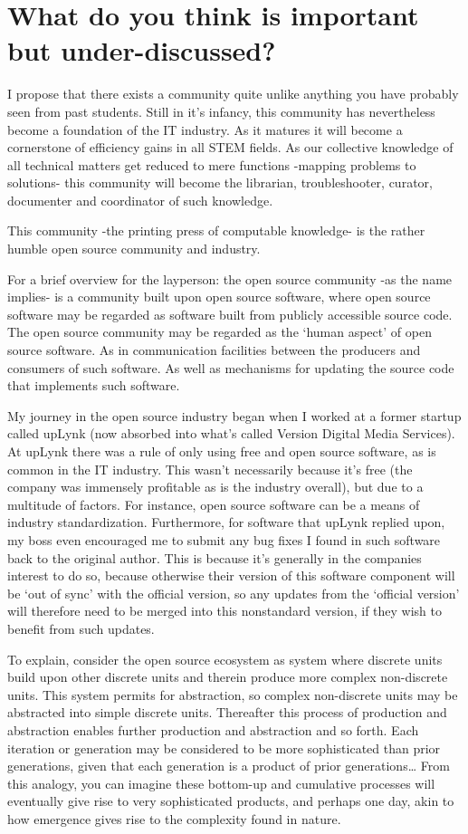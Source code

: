 \section{What do you think is important but under-discussed?}

I propose that there exists a community quite unlike anything you have probably seen from past students. Still in it’s infancy, this community has nevertheless become a foundation of the IT industry. As it matures it will become a cornerstone of efficiency gains in all STEM fields. As our collective knowledge of all technical matters get reduced to mere functions -mapping problems to solutions- this community will become the librarian, troubleshooter, curator, documenter and coordinator of such knowledge.

This community -the printing press of computable knowledge- is the rather humble open source community and industry.

For a brief overview for the layperson: the open source community -as the name implies- is a community built upon open source software, where open source software may be regarded as software built from publicly accessible source code. The open source community may be regarded as the ‘human aspect’ of open source software. As in communication facilities between the producers and consumers of such software. As well as mechanisms for updating the source code that implements such software.

My journey in the open source industry began when I worked at a former startup called upLynk (now absorbed into what's called Version Digital Media Services). At upLynk there was a rule of only using free and open source software, as is common in the IT industry. This wasn’t necessarily because it’s free (the company was immensely profitable as is the industry overall), but due to a multitude of factors. For instance, open source software can be a means of industry standardization. Furthermore, for software that upLynk replied upon, my boss even encouraged me to submit any bug fixes I found in such software back to the original author. This is because it’s generally in the companies interest to do so, because otherwise their version of this software component will be ‘out of sync’ with the official version, so any updates from the ‘official version’ will therefore need to be merged into this nonstandard version, if they wish to benefit from such updates.

To explain, consider the open source ecosystem as system where discrete units build upon other discrete units and therein produce more complex non-discrete units. This system permits for abstraction, so complex non-discrete units may be abstracted into simple discrete units. Thereafter this process of production and abstraction enables further production and abstraction and so forth. Each iteration or generation may be considered to be more sophisticated than prior generations, given that each generation is a product of prior generations… From this analogy, you can imagine these bottom-up and cumulative processes will eventually give rise to very sophisticated products, and perhaps one day, akin to how emergence gives rise to the complexity found in nature.

